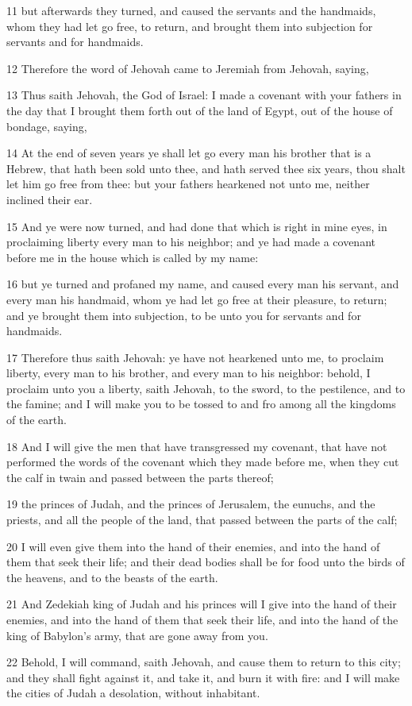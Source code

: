 \par 11 but afterwards they turned, and caused the servants and the handmaids, whom they had let go free, to return, and brought them into subjection for servants and for handmaids.
\par 12 Therefore the word of Jehovah came to Jeremiah from Jehovah, saying,
\par 13 Thus saith Jehovah, the God of Israel: I made a covenant with your fathers in the day that I brought them forth out of the land of Egypt, out of the house of bondage, saying,
\par 14 At the end of seven years ye shall let go every man his brother that is a Hebrew, that hath been sold unto thee, and hath served thee six years, thou shalt let him go free from thee: but your fathers hearkened not unto me, neither inclined their ear.
\par 15 And ye were now turned, and had done that which is right in mine eyes, in proclaiming liberty every man to his neighbor; and ye had made a covenant before me in the house which is called by my name:
\par 16 but ye turned and profaned my name, and caused every man his servant, and every man his handmaid, whom ye had let go free at their pleasure, to return; and ye brought them into subjection, to be unto you for servants and for handmaids.
\par 17 Therefore thus saith Jehovah: ye have not hearkened unto me, to proclaim liberty, every man to his brother, and every man to his neighbor: behold, I proclaim unto you a liberty, saith Jehovah, to the sword, to the pestilence, and to the famine; and I will make you to be tossed to and fro among all the kingdoms of the earth.
\par 18 And I will give the men that have transgressed my covenant, that have not performed the words of the covenant which they made before me, when they cut the calf in twain and passed between the parts thereof;
\par 19 the princes of Judah, and the princes of Jerusalem, the eunuchs, and the priests, and all the people of the land, that passed between the parts of the calf;
\par 20 I will even give them into the hand of their enemies, and into the hand of them that seek their life; and their dead bodies shall be for food unto the birds of the heavens, and to the beasts of the earth.
\par 21 And Zedekiah king of Judah and his princes will I give into the hand of their enemies, and into the hand of them that seek their life, and into the hand of the king of Babylon's army, that are gone away from you.
\par 22 Behold, I will command, saith Jehovah, and cause them to return to this city; and they shall fight against it, and take it, and burn it with fire: and I will make the cities of Judah a desolation, without inhabitant.


